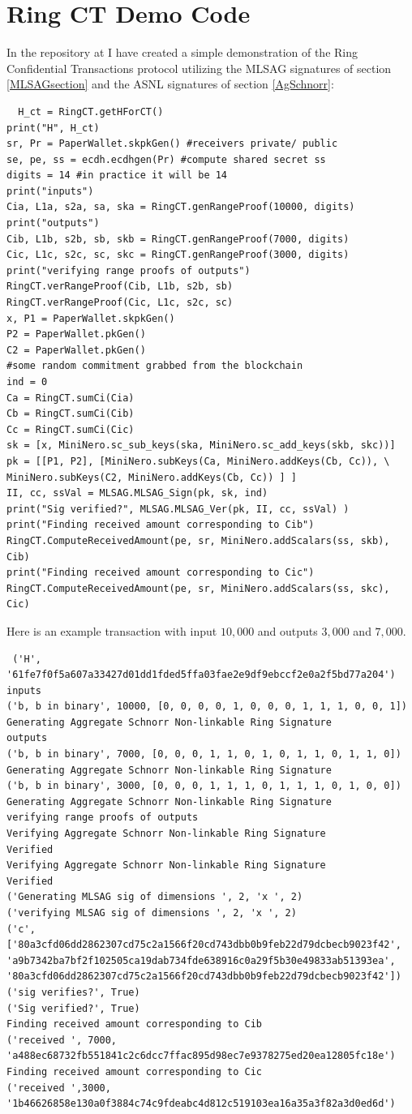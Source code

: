 \documentclass[12pt,english]{mrl}
\theoremstyle{definition}
\numberwithin{equation}{section}
\numberwithin{figure}{section}
\numberwithin{equation}{section}
\numberwithin{equation}{section}
\numberwithin{figure}{section}
\begin{document}
\section{Ring CT Demo Code}
In the repository at \cite{Snoe} I have created a simple demonstration of the Ring Confidential Transactions protocol utilizing the MLSAG signatures of section \ref{MLSAGsection} and the ASNL signatures of section \ref{AgSchnorr}:
\begin{verbatim}
  H_ct = RingCT.getHForCT()
print("H", H_ct)
sr, Pr = PaperWallet.skpkGen() #receivers private/ public
se, pe, ss = ecdh.ecdhgen(Pr) #compute shared secret ss
digits = 14 #in practice it will be 14
print("inputs")
Cia, L1a, s2a, sa, ska = RingCT.genRangeProof(10000, digits)
print("outputs")
Cib, L1b, s2b, sb, skb = RingCT.genRangeProof(7000, digits)
Cic, L1c, s2c, sc, skc = RingCT.genRangeProof(3000, digits)
print("verifying range proofs of outputs")
RingCT.verRangeProof(Cib, L1b, s2b, sb)
RingCT.verRangeProof(Cic, L1c, s2c, sc)
x, P1 = PaperWallet.skpkGen()
P2 = PaperWallet.pkGen()
C2 = PaperWallet.pkGen() 
#some random commitment grabbed from the blockchain
ind = 0
Ca = RingCT.sumCi(Cia)
Cb = RingCT.sumCi(Cib)
Cc = RingCT.sumCi(Cic)
sk = [x, MiniNero.sc_sub_keys(ska, MiniNero.sc_add_keys(skb, skc))]
pk = [[P1, P2], [MiniNero.subKeys(Ca, MiniNero.addKeys(Cb, Cc)), \
MiniNero.subKeys(C2, MiniNero.addKeys(Cb, Cc)) ] ]
II, cc, ssVal = MLSAG.MLSAG_Sign(pk, sk, ind)
print("Sig verified?", MLSAG.MLSAG_Ver(pk, II, cc, ssVal) )
print("Finding received amount corresponding to Cib")
RingCT.ComputeReceivedAmount(pe, sr, MiniNero.addScalars(ss, skb), Cib)
print("Finding received amount corresponding to Cic")
RingCT.ComputeReceivedAmount(pe, sr, MiniNero.addScalars(ss, skc), Cic)

\end{verbatim} 
Here is an example transaction with input $10,000$ and outputs $3,000$ and $7,000$. 
\begin{verbatim}
 ('H', '61fe7f0f5a607a33427d01dd1fded5ffa03fae2e9df9ebccf2e0a2f5bd77a204')
inputs
('b, b in binary', 10000, [0, 0, 0, 0, 1, 0, 0, 0, 1, 1, 1, 0, 0, 1])
Generating Aggregate Schnorr Non-linkable Ring Signature
outputs
('b, b in binary', 7000, [0, 0, 0, 1, 1, 0, 1, 0, 1, 1, 0, 1, 1, 0])
Generating Aggregate Schnorr Non-linkable Ring Signature
('b, b in binary', 3000, [0, 0, 0, 1, 1, 1, 0, 1, 1, 1, 0, 1, 0, 0])
Generating Aggregate Schnorr Non-linkable Ring Signature
verifying range proofs of outputs
Verifying Aggregate Schnorr Non-linkable Ring Signature
Verified
Verifying Aggregate Schnorr Non-linkable Ring Signature
Verified
('Generating MLSAG sig of dimensions ', 2, 'x ', 2)
('verifying MLSAG sig of dimensions ', 2, 'x ', 2)
('c', 
['80a3cfd06dd2862307cd75c2a1566f20cd743dbb0b9feb22d79dcbecb9023f42',
'a9b7342ba7bf2f102505ca19dab734fde638916c0a29f5b30e49833ab51393ea',
'80a3cfd06dd2862307cd75c2a1566f20cd743dbb0b9feb22d79dcbecb9023f42'])
('sig verifies?', True)
('Sig verified?', True)
Finding received amount corresponding to Cib
('received ', 7000,
'a488ec68732fb551841c2c6dcc7ffac895d98ec7e9378275ed20ea12805fc18e')
Finding received amount corresponding to Cic
('received ',3000,
'1b46626858e130a0f3884c74c9fdeabc4d812c519103ea16a35a3f82a3d0ed6d')
\end{verbatim}
\end{document}

